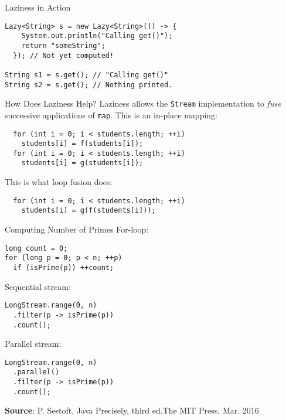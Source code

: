 \documentclass{beamer}
\begin{document}
\begin{frame}[fragile]{Laziness in Action}
\begin{lstlisting}
Lazy<String> s = new Lazy<String>(() -> {
    System.out.println("Calling get()");
    return "someString";
  }); // Not yet computed!

String s1 = s.get(); // "Calling get()"
String s2 = s.get(); // Nothing printed.
\end{lstlisting}
\end{frame}

\begin{frame}[fragile]{How Does Laziness Help?}
Laziness allows the \lstinline{Stream} implementation to \emph{fuse} successive applications of \lstinline{map}. This is an in-place mapping:

\begin{lstlisting}
  for (int i = 0; i < students.length; ++i)
    students[i] = f(students[i]);
  for (int i = 0; i < students.length; ++i)
    students[i] = g(students[i]);
\end{lstlisting}

\pause{} This is what loop fusion does:
\begin{lstlisting}
  for (int i = 0; i < students.length; ++i)
    students[i] = g(f(students[i]));
\end{lstlisting}
\end{frame}

\begin{frame}[fragile]{Computing Number of Primes}
For-loop:
\begin{lstlisting}
long count = 0;
for (long p = 0; p < n; ++p)
  if (isPrime(p)) ++count;
\end{lstlisting}

\pause{} Sequential stream:
\begin{lstlisting}
LongStream.range(0, n)
  .filter(p -> isPrime(p))
  .count();
\end{lstlisting}

\pause{} Parallel stream:
\begin{lstlisting}
LongStream.range(0, n)
  .parallel()
  .filter(p -> isPrime(p))
  .count();
\end{lstlisting}

\footnotesize{\textbf{Source}: P. Sestoft, Java Precisely, third ed.The MIT Press, Mar. 2016}
\end{frame}
\end{document}
